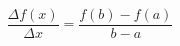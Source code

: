 \documentclass[preview]{standalone}
\begin{document}
\begin{align*}
\dfrac{\Delta f(x)}{\Delta x} = \dfrac{f(b) - f(a)}{b - a}
\end{align*}
\end{document}
